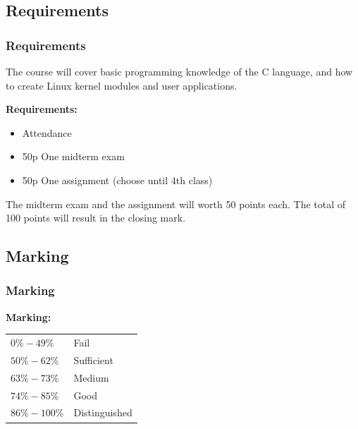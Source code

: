 \documentclass[
	11pt, %
]{beamer}
\begin{document}
\begin{frame}
    \subsection{Requirements}
	\frametitle{Requirements}

    The course will cover basic programming knowledge of the C language,
    and how to create Linux kernel modules and user applications.

	\bigskip %

    \textbf{Requirements:}
	\begin{itemize}
		\item Attendance
		\item 50p One midterm exam
        \item 50p One assignment (choose until 4th class)
	\end{itemize}

	\bigskip %

    The midterm exam and the assignment will worth 50 points each.
    The total of 100 points will result in the closing mark.

\end{frame}

\begin{frame}
    \subsection{Marking}
	\frametitle{Marking}

    \textbf{Marking:}
    \bigskip
    \begin{table}[h]
        \begin{tabular}{p{}p{}}
            $0\% - 49\%$       & Fail \\
            $50\% - 62\%$  & Sufficient \\
            $63\% - 73\%$  & Medium \\
            $74\% - 85\%$  & Good \\
            $86\% - 100\%$ & Distinguished \\
        \end{tabular}
    \end{table}

\end{frame}
\end{document}
